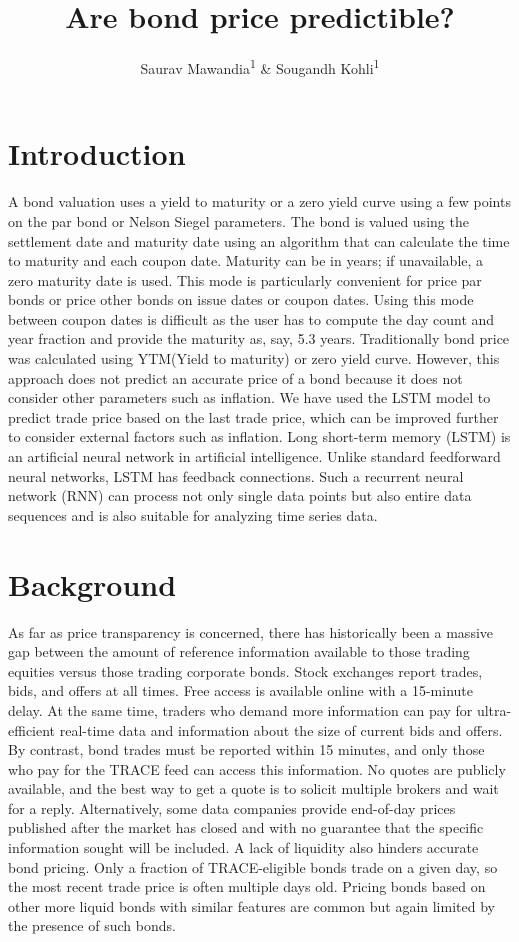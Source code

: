 \documentclass[
  man]{apa6}
\title{Are bond price predictible?}
\author{Saurav Mawandia\textsuperscript{1} \& Sougandh Kohli\textsuperscript{1}}
\date{}
\affiliation{\vspace{0.5cm}\textsuperscript{1} Harrisburg University of Science and Technology}
\begin{document}
\maketitle

\hypertarget{introduction}{%
\section{Introduction}\label{introduction}}

A bond valuation uses a yield to maturity or a zero yield curve using a few points on the par bond or Nelson Siegel parameters. The bond is valued using the settlement date and maturity date using an algorithm that can calculate the time to maturity and each coupon date. Maturity can be in years; if unavailable, a zero maturity date is used. This mode is particularly convenient for price par bonds or price other bonds on issue dates or coupon dates. Using this mode between coupon dates is difficult as the user has to compute the day count and year fraction and provide the maturity as, say, 5.3 years. Traditionally bond price was calculated using YTM(Yield to maturity) or zero yield curve. However, this approach does not predict an accurate price of a bond because it does not consider other parameters such as inflation. We have used the LSTM model to predict trade price based on the last trade price, which can be improved further to consider external factors such as inflation. Long short-term memory (LSTM) is an artificial neural network in artificial intelligence. Unlike standard feedforward neural networks, LSTM has feedback connections. Such a recurrent neural network (RNN) can process not only single data points but also entire data sequences and is also suitable for analyzing time series data.

\hypertarget{background}{%
\section{Background}\label{background}}

As far as price transparency is concerned, there has historically been a massive gap between the amount of reference information available to those trading equities versus those trading corporate bonds. Stock exchanges report trades, bids, and offers at all times. Free access is available online with a 15-minute delay. At the same time, traders who demand more information can pay for ultra-efficient real-time data and information about the size of current bids and offers. By contrast, bond trades must be reported within 15 minutes, and only those who pay for the TRACE feed can access this information. No quotes are publicly available, and the best way to get a quote is to solicit multiple brokers and wait for a reply. Alternatively, some data companies provide end-of-day prices published after the market has closed and with no guarantee that the specific information sought will be included. A lack of liquidity also hinders accurate bond pricing. Only a fraction of TRACE-eligible bonds trade on a given day, so the most recent trade price is often multiple days old. Pricing bonds based on other more liquid bonds with similar features are common but again limited by the presence of such bonds.
\end{document}
